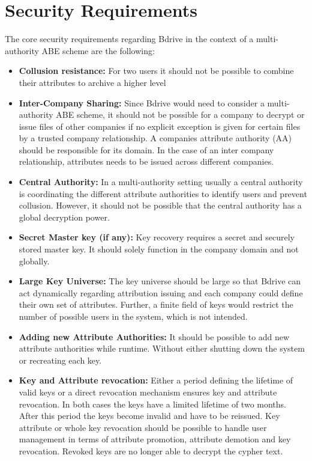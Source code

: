 \documentclass[twocolumn]{article}
\begin{document}

\section{Security Requirements}
\label{sec:securityRequirements}
The core security requirements regarding Bdrive in the context of a multi-authority ABE scheme are the following:
\begin{itemize}
\item \textbf{Collusion resistance:} For two users it should not be possible to combine their attributes to archive a higher level 
\item \textbf{Inter-Company Sharing:} Since Bdrive would need to consider a multi-authority ABE scheme, it should not be possible for a company to decrypt or issue files of other companies if no explicit exception is given for certain files by a trusted company relationship. A companies attribute authority (AA) should be responsible for its domain. In the case of an inter company relationship, attributes needs to be issued across different companies. 
\item \textbf{Central Authority:} In a multi-authority setting usually a central authority is coordinating the different attribute authorities to identify users and prevent collusion. However, it should not be possible that the central authority has a global decryption power.  
\item \textbf{Secret Master key (if any):} Key recovery requires a secret and securely stored master key. It should solely function in the company domain and not globally. 
\item \textbf{Large Key Universe:} The key universe should be large so that Bdrive can act dynamically regarding attribution issuing and each company could define their own set of attributes. Further, a finite field of keys would restrict the number of possible users in the system, which is not intended.
\item \textbf{Adding new Attribute Authorities:} It should be possible to add new attribute authorities while runtime. Without either shutting down the system or recreating each key. 
\item \textbf{Key and Attribute revocation:} Either a period defining the lifetime of valid keys or a direct revocation mechanism ensures key and attribute revocation. In both cases the keys have a limited lifetime of two months. After this period the keys become invalid and have to be reissued.
Key attribute or whole key revocation should be possible to handle user management in terms of attribute promotion, attribute demotion and key revocation. Revoked keys are no longer able to decrypt the cypher text. 
\end{itemize}
\end{document}
